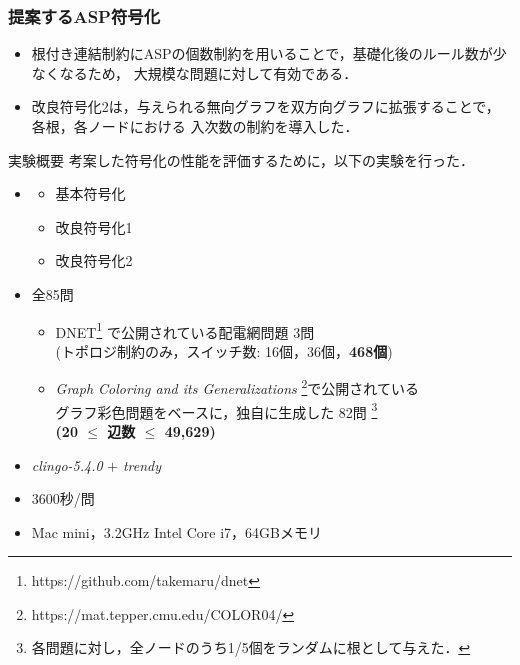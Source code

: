 \documentclass[dvipdfmx,11pt]{beamer}
\begin{document}
\begin{frame}\frametitle{提案するASP符号化}
 
 
\begin{table}[t]
 \centering
 
\end{table}
\vfill
 \begin{itemize}
  \item 根付き連結制約にASPの個数制約を用いることで，基礎化後のルール数が少なくなるため，
 		大規模な問題に対して有効である．
  \item 改良符号化2は，与えられる無向グラフを双方向グラフに拡張することで，各根，各ノードにおける
		入次数の制約を導入した．
 \end{itemize}
 
\end{frame}
\begin{frame}{実験概要}
  \renewcommand{\thefootnote}{\fnsymbol{footnote}}
  \setcounter{footnote}{1}
  考案した符号化の性能を評価するために，以下の実験を行った．
  \begin{itemize}
  \item {}
    \begin{itemize}
	 \item 基本符号化
	 \item 改良符号化1
	 \item 改良符号化2
    \end{itemize}
  \item {} 全85問
    \begin{itemize}
    \item DNET\footnote{https://github.com/takemaru/dnet}%
      で公開されている配電網問題 3問 \\ (トポロジ制約のみ，スイッチ数:
      16個，36個，\alert{\bf 468個})
    \item \textit{Graph Coloring and its Generalizations}
      \footnote{https://mat.tepper.cmu.edu/COLOR04/}で公開されている \\
      グラフ彩色問題をベースに，独自に生成した 82問 
      \footnote{各問題に対し，全ノードのうち1/5個をランダムに根として与えた．}\\
      \alert{\bf (20 $\leq$ 辺数 $\leq$ 49,629)}
    \end{itemize}
  \item {} \textit{clingo-5.4.0} $+$ \textit{trendy}
  \item {} 3600秒/問
  \item {} Mac mini，3.2GHz Intel Core i7，64GBメモリ
  \end{itemize}
\end{frame}
\end{document}
